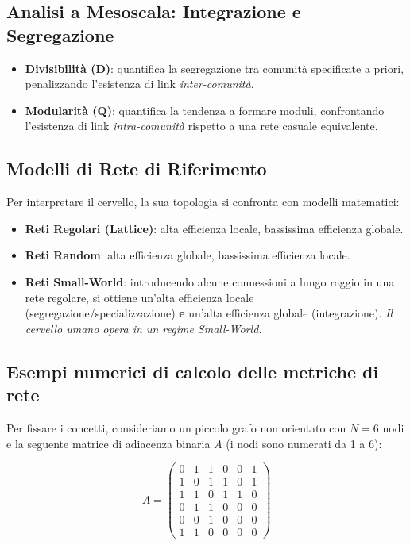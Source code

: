 \subsection{Analisi a Mesoscala: Integrazione e Segregazione}
\begin{itemize}
    \item \textbf{Divisibilità (D)}: quantifica la segregazione tra comunità specificate a priori, penalizzando l'esistenza di link \textit{inter-comunità}.
    \item \textbf{Modularità (Q)}: quantifica la tendenza a formare moduli, confrontando l'esistenza di link \textit{intra-comunità} rispetto a una rete casuale equivalente.
\end{itemize}

\subsection{Modelli di Rete di Riferimento}
Per interpretare il cervello, la sua topologia si confronta con modelli matematici:
\begin{itemize}
    \item \textbf{Reti Regolari (Lattice)}: alta efficienza locale, bassissima efficienza globale.
    \item \textbf{Reti Random}: alta efficienza globale, bassissima efficienza locale.
    \item \textbf{Reti Small-World}: introducendo alcune connessioni a lungo raggio in una rete regolare, si ottiene un'alta efficienza locale (segregazione/specializzazione) \textbf{e} un'alta efficienza globale (integrazione). \textit{Il cervello umano opera in un regime Small-World.}
\end{itemize}
\subsection{Esempi numerici di calcolo delle metriche di rete}

Per fissare i concetti, consideriamo un piccolo grafo non orientato con $N = 6$ nodi e la seguente matrice di adiacenza binaria $A$ (i nodi sono numerati da 1 a 6):

\[
A = \begin{pmatrix}
0 & 1 & 1 & 0 & 0 & 1 \\
1 & 0 & 1 & 1 & 0 & 1 \\
1 & 1 & 0 & 1 & 1 & 0 \\
0 & 1 & 1 & 0 & 0 & 0 \\
0 & 0 & 1 & 0 & 0 & 0 \\
1 & 1 & 0 & 0 & 0 & 0
\end{pmatrix}
\]

